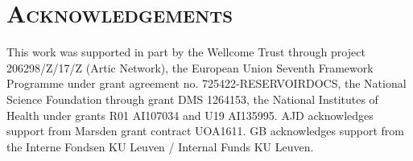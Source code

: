 \documentclass[webpdf,mynatbib,nosurname,nogrid,noCE,noMSC]{SYS}
\begin{document}
\vspace{-0.55cm}

\section*{\textsc{Acknowledgements}}

This work was supported in part by the Wellcome Trust through project 206298/Z/17/Z (Artic Network), the European Union Seventh Framework Programme under grant agreement no. 725422-RESERVOIRDOCS, the National Science Foundation through grant DMS 1264153, the National Institutes of Health under grants R01 AI107034 and U19 AI135995. AJD acknowledges support from Marsden grant contract UOA1611.
GB acknowledges support from the Interne Fondsen KU Leuven / Internal Funds KU Leuven.

\vspace*{-2em}



\end{document}
